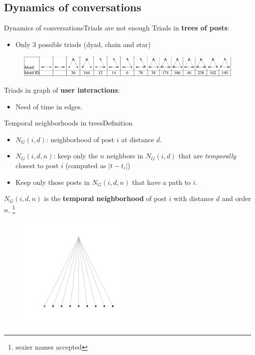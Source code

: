 \documentclass{beamer}
\begin{document}
\subsection{Dynamics of conversations}
\begin{frame}{Dynamics of conversations}{Triads are not enough}
Triads in \textbf{trees of posts}:
	\begin{itemize}
		\item Only 3 possible triads (dyad, chain and star)
	\end{itemize}
	\begin{figure}
		\centering
		\includegraphics[width=1\textwidth]{triads}
	\end{figure}
Triads in graph of \textbf{user interactions}:
	\begin{itemize}
		\item Need of time in edges.
	\end{itemize}
\end{frame}

\begin{frame}{Temporal neighborhoods in trees}{Definition}
\begin{itemize}
	\item $N_{G}(i, d)$: neighborhood of post $i$ at distance $d$.
	\item $N_{G}(i, d, n)$: keep only the $n$ neighbors in $N_{G}(i, d)$ that are \textit{temporally} closest to post $i$ (computed as $|t-t_i|$)
	\item Keep only those posts in $N_{G}(i, d, n)$ that have a path to $i$. 
\end{itemize}

 $N_{G}(i, d, n)$ is the \textbf{temporal neighborhood} of post $i$ with distance $d$ and order $n$. \footnote{sexier names accepted}

	\begin{figure}
		\centering
		\includegraphics[width=0.5\textwidth]{large_neighborhood}
	\end{figure}
	
\end{frame}
\end{document}
